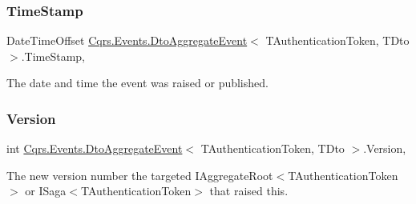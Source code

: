 \subsubsection{\texorpdfstring{Time\+Stamp}{TimeStamp}}
{\footnotesize\ttfamily Date\+Time\+Offset \hyperlink{classCqrs_1_1Events_1_1DtoAggregateEvent}{Cqrs.\+Events.\+Dto\+Aggregate\+Event}$<$ T\+Authentication\+Token, T\+Dto $>$.Time\+Stamp\hspace{0.3cm}{\ttfamily [get]}, {\ttfamily [set]}}



The date and time the event was raised or published. 

\mbox{\label{classCqrs_1_1Events_1_1DtoAggregateEvent_a2c3a579eba3effd19cf0ae740ca33389_a2c3a579eba3effd19cf0ae740ca33389}} 
\subsubsection{\texorpdfstring{Version}{Version}}
{\footnotesize\ttfamily int \hyperlink{classCqrs_1_1Events_1_1DtoAggregateEvent}{Cqrs.\+Events.\+Dto\+Aggregate\+Event}$<$ T\+Authentication\+Token, T\+Dto $>$.Version\hspace{0.3cm}{\ttfamily [get]}, {\ttfamily [set]}}



The new version number the targeted I\+Aggregate\+Root$<$\+T\+Authentication\+Token$>$ or I\+Saga$<$\+T\+Authentication\+Token$>$ that raised this. 


